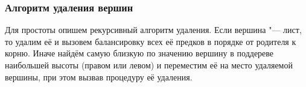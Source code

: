 \begin{frame}
    \frametitle{Алгоритм удаления вершин}

    Для простоты опишем рекурсивный алгоритм удаления.
    Если вершина "--- лист, то удалим её и вызовем балансировку всех её предков в порядке от родителя к корню.
    Иначе найдём самую близкую по значению вершину в поддереве наибольшей высоты (правом или левом) и переместим её на место удаляемой вершины,
    при этом вызвав процедуру её удаления.

\end{frame}
